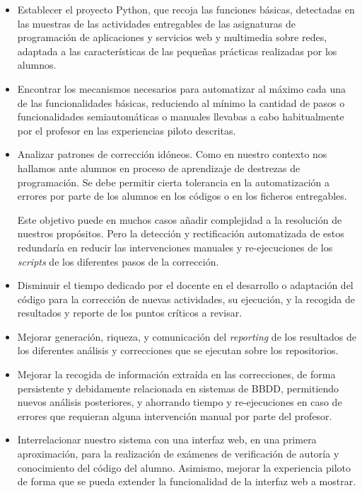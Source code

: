 \begin{itemize}
\item Establecer el proyecto Python, que recoja las funciones básicas, detectadas en las muestras de las actividades entregables de las asignaturas de programación de aplicaciones y servicios web y multimedia sobre redes, adaptada a las características de las pequeñas prácticas realizadas por los alumnos.

\item Encontrar los mecanismos necesarios para automatizar al máximo cada una de las funcionalidades básicas, reduciendo al mínimo la cantidad de pasos o funcionalidades semiautomáticas o manuales llevabas a cabo habitualmente por el profesor en las experiencias piloto descritas.

\item Analizar patrones de corrección idóneos. Como en nuestro contexto nos hallamos ante alumnos en proceso de aprendizaje de destrezas de programación. Se debe permitir cierta tolerancia en la automatización a errores por parte de los alumnos en los códigos o en los ficheros entregables.


Este objetivo puede en muchos casos añadir complejidad a la resolución de nuestros propósitos. Pero la detección y rectificación automatizada de estos redundaría en reducir las intervenciones manuales y re-ejecuciones de los \textit{scripts} de los diferentes pasos de la corrección.

\item Disminuir el tiempo dedicado por el docente en el desarrollo o adaptación del código para la corrección de nuevas actividades, su ejecución, y la recogida de resultados y reporte de los puntos críticos a revisar.

\item Mejorar generación, riqueza, y comunicación del \textit{reporting} de los resultados de los diferentes análisis y correcciones que se ejecutan sobre los repositorios.

\item Mejorar la recogida de información extraída en las correcciones, de forma persistente y debidamente relacionada en sistemas de BBDD, permitiendo nuevos análisis posteriores, y ahorrando tiempo y re-ejecuciones en caso de errores que requieran alguna intervención manual por parte del profesor.

\item Interrelacionar nuestro sistema con una interfaz web, en una primera aproximación, para la realización de exámenes de verificación de autoría y conocimiento del código del alumno. Asimismo, mejorar la experiencia piloto de forma que se pueda extender la funcionalidad de la interfaz web a mostrar.
\end{itemize}

